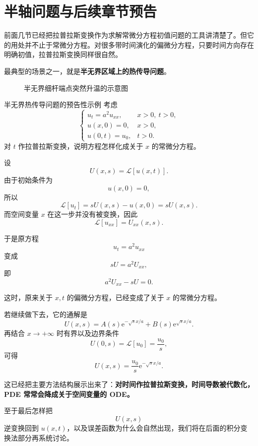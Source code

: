\section{半轴问题与后续章节预告}

前面几节已经把拉普拉斯变换作为求解常微分方程初值问题的工具讲清楚了。但它的用处并不止于常微分方程。对很多带时间演化的偏微分方程，只要时间方向存在明确初值，拉普拉斯变换同样很自然。

最典型的场景之一，就是\textbf{半无界区域上的热传导问题}。

\begin{figure}[htbp]
\centering
{}
\caption{半无界细杆端点突然升温的示意图}
\label{fig:semi-infinite-rod}
\end{figure}

\begin{lizi}{半无界热传导问题的预告性示例}{}
考虑
\[
    \begin{cases}
        u_t=a^2u_{xx}, & x>0,\ t>0,\\
        u(x,0)=0, & x>0,\\
        u(0,t)=u_0, & t>0.
    \end{cases}
\]
对 $t$ 作拉普拉斯变换，说明方程怎样化成关于 $x$ 的常微分方程。

\begin{jie}
设
\[
    U(x,s)=\mathcal{L}[u(x,t)].
\]
由于初始条件为
\[
    u(x,0)=0,
\]
所以
\[
    \mathcal{L}[u_t]
    =
    sU(x,s)-u(x,0)
    =
    sU(x,s).
\]
而空间变量 $x$ 在这一步并没有被变换，因此
\[
    \mathcal{L}[u_{xx}]
    =
    U_{xx}(x,s).
\]

于是原方程
\[
    u_t=a^2u_{xx}
\]
变成
\[
    sU=a^2U_{xx},
\]
即
\[
    a^2U_{xx}-sU=0.
\]

这时，原来关于 $x,t$ 的偏微分方程，已经变成了关于 $x$ 的常微分方程。

若继续做下去，它的通解是
\[
    U(x,s)=A(s)\mathrm{e}^{-\sqrt{s}x/a}+B(s)\mathrm{e}^{\sqrt{s}x/a}.
\]
再结合 $x\to+\infty$ 时有界以及边界条件
\[
    U(0,s)=\mathcal{L}[u_0]=\frac{u_0}{s},
\]
可得
\[
    U(x,s)
    =
    \frac{u_0}{s}\mathrm{e}^{-\sqrt{s}x/a}.
\]

这已经把主要方法结构展示出来了：\textbf{对时间作拉普拉斯变换，时间导数被代数化，PDE 常常会降成关于空间变量的 ODE。}

至于最后怎样把
\[
    U(x,s)
\]
逆变换回到 $u(x,t)$，以及误差函数为什么会自然出现，我们将在后面的积分变换法部分再系统讨论。
\end{jie}
\end{lizi}

